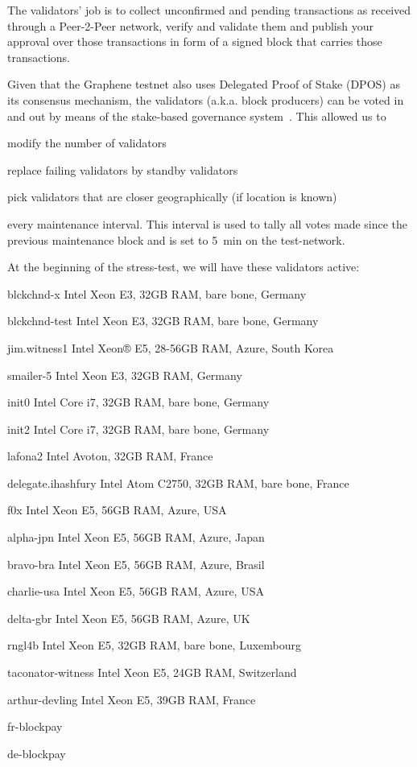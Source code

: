 The validators' job is to collect unconfirmed and pending transactions as
received through a Peer-2-Peer network, verify and validate them and publish
your approval over those transactions in form of a signed block that carries
those transactions.

Given that the Graphene testnet also uses Delegated Proof of Stake (DPOS) as
its consensus mechanism, the validators (a.k.a. block producers) can be voted
in and out by means of the stake-based governance system~\cite{bts:general}.
This allowed us to 
\begin{inparaenum}
 \item modify the number of validators
 \item replace failing validators by standby validators
 \item pick validators that are closer geographically (if location is known)
\end{inparaenum}
every maintenance interval. This interval is used to tally all votes made
since the previous maintenance block and is set to \SI{5}{min} on the
test-network.

At the beginning of the stress-test, we will have these validators active:

\begin{compactdesc}
 \item[blckchnd-x] Intel Xeon E3, 32GB RAM, bare bone, Germany
 \item[blckchnd-test] Intel Xeon E3, 32GB RAM, bare bone, Germany
 \item[jim.witness1] Intel Xeon® E5, 28-56GB RAM, Azure, South Korea
 \item[smailer-5]  Intel Xeon E3, 32GB RAM, Germany
 \item[init0] Intel Core i7, 32GB RAM, bare bone, Germany
 \item[init2] Intel Core i7, 32GB RAM, bare bone, Germany
 \item[lafona2] Intel Avoton, 32GB RAM, France
 \item[delegate.ihashfury] Intel Atom C2750, 32GB RAM, bare bone, France
 \item[f0x] Intel Xeon E5, 56GB RAM, Azure, USA
 \item[alpha-jpn] Intel Xeon E5, 56GB RAM, Azure, Japan
 \item[bravo-bra] Intel Xeon E5, 56GB RAM, Azure, Brasil
 \item[charlie-usa] Intel Xeon E5, 56GB RAM, Azure, USA
 \item[delta-gbr] Intel Xeon E5, 56GB RAM, Azure, UK
 \item[rngl4b] Intel Xeon E5, 32GB RAM, bare bone, Luxembourg
 \item[taconator-witness] Intel Xeon E5, 24GB RAM, Switzerland
 \item[arthur-devling] Intel Xeon E5, 39GB RAM, France
 \item[fr-blockpay] 
 \item[de-blockpay] 
\end{compactdesc}
